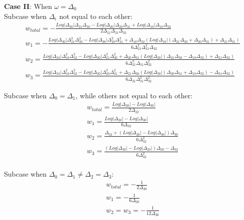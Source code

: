 \documentclass[10pt]{article}
\begin{document}
\textbf{Case II}: When $\omega=\Delta_{0}$\\

Subcase when $\Delta_i$ not equal to each other:\\

\begin{subequations}\label{wtt6}
\begin{align}
&w_{total}=-\frac{Log|\Delta_{30}|\Delta_{21}\Delta_{30}-Log|\Delta_{20}|\Delta_{20}\Delta_{31}+Log|\Delta_{10}|\Delta_{10}\Delta_{32}}{2\Delta_{21}\Delta_{31}\Delta_{32}}\\
&w_{1}=-\frac{Log|\Delta_{30}|\Delta_{21}^2\Delta_{30}^2-Log|\Delta_{20}|\Delta_{20}^2\Delta_{31}^2+\Delta_{10}\Delta_{32}(Log|\Delta_{10}|(\Delta_{21}\Delta_{30}+\Delta_{20}\Delta_{31})+\Delta_{21}\Delta_{31})}{6\Delta_{21}^2\Delta_{31}^2\Delta_{32}}\\
&w_{2}=\frac{Log|\Delta_{10}|\Delta_{10}^2\Delta_{32}^2-Log|\Delta_{30}|\Delta_{21}^2\Delta_{30}^2+\Delta_{20}\Delta_{31}(Log|\Delta_{20}|(\Delta_{21}\Delta_{30}-\Delta_{10}\Delta_{32})+\Delta_{21}\Delta_{32})}{6\Delta_{21}^2\Delta_{31}\Delta_{32}^2}\\
&w_{3}=\frac{Log|\Delta_{10}|\Delta_{10}^2\Delta_{32}^2-Log|\Delta_{20}|\Delta_{20}^2\Delta_{31}^2+\Delta_{21}\Delta_{30}(Log|\Delta_{30}|(\Delta_{20}\Delta_{31}+\Delta_{10}\Delta_{32})-\Delta_{31}\Delta_{32})}{6\Delta_{21}\Delta_{31}^2\Delta_{32}^2}
\end{align}
\end{subequations}

Subcase when $\Delta_0=\Delta_1$, while others not equal to each other:\\

\begin{subequations}\label{wtt7}
\begin{align}
&w_{total}=\frac{Log|\Delta_{20}|-Log|\Delta_{30}|}{2\Delta_{32}}\\
&w_{1}=\frac{Log|\Delta_{20}|-Log|\Delta_{30}|}{6\Delta_{32}}\\
&w_2=\frac{\Delta_{32}+(Log|\Delta_{20}|-Log|\Delta_{30}|)\Delta_{30}}{6\Delta_{32}^2}\\
&w_3=\frac{(Log|\Delta_{30}|-Log|\Delta_{20}|)\Delta_{20}-\Delta_{32}}{6\Delta_{32}^2}
\end{align}
\end{subequations}\\

Subcase when $\Delta_0=\Delta_1\neq\Delta_2=\Delta_3$:
\begin{subequations}\label{wtt8}
\begin{align}
&w_{total}=-\frac{1}{2\Delta_{20}}\\
&w_{1}=-\frac{1}{6\Delta_{20}}\\
&w_2=w_3=-\frac{1}{12\Delta_{20}}
\end{align}
\end{subequations}
\end{document}

